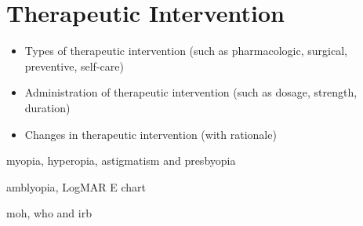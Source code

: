 \section{Therapeutic Intervention}

\begin{itemize}
    \item Types of therapeutic intervention (such as pharmacologic, surgical, preventive, self-care)
    \item Administration of therapeutic intervention (such as dosage, strength, duration)
    \item Changes in therapeutic intervention (with rationale)
\end{itemize}


\gls{myopia}, \gls{hyperopia}, \gls{astigmatism} and \gls{presbyopia}

\gls{amblyopia}, \gls{LogMAR E chart} 

\gls{moh}, \gls{who} and \gls{irb}